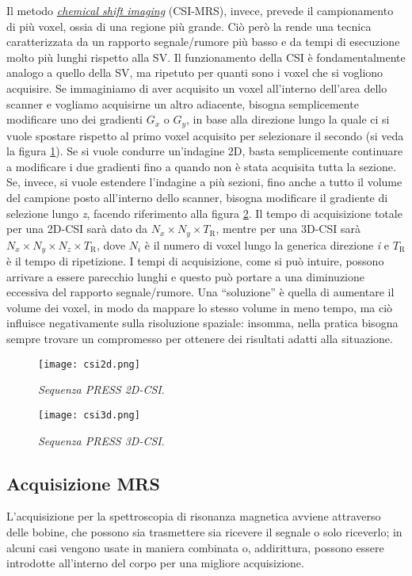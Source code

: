 \documentclass{report}
\newcommand{\virgolette}[1]{``#1''}
\newcommand{\figref}[1]{figura \ref{#1}}
\numberwithin{equation}{section}
\numberwithin{figure}{section}
\begin{document}
Il metodo \underline{\textit{chemical shift imaging}} (CSI-MRS), invece, prevede il campionamento di più voxel, ossia di una regione più grande. Ciò però la rende una tecnica caratterizzata da un rapporto segnale/rumore più basso e da tempi di esecuzione molto più lunghi rispetto alla SV. Il funzionamento della CSI è fondamentalmente analogo a quello della SV, ma ripetuto per quanti sono i voxel che si vogliono acquisire. Se immaginiamo di aver acquisito un voxel all'interno dell'area dello scanner e vogliamo acquisirne un altro adiacente, bisogna semplicemente modificare uno dei gradienti $G_x$ o $G_y$, in base alla direzione lungo la quale ci si vuole spostare rispetto al primo voxel acquisito per selezionare il secondo (si veda la \figref{fig:csi2d}). Se si vuole condurre un'indagine 2D, basta semplicemente continuare a modificare i due gradienti fino a quando non è stata acquisita tutta la sezione. Se, invece, si vuole estendere l'indagine a più sezioni, fino anche a tutto il volume del campione posto all'interno dello scanner, bisogna modificare il gradiente di selezione lungo \textit{z}, facendo riferimento alla \figref{fig:csi3d}. Il tempo di acquisizione totale per una 2D-CSI sarà dato da $N_x \times N_y \times T_\mathrm{R}$, mentre per una 3D-CSI sarà $N_x \times N_y \times N_z \times T_\mathrm{R}$, dove $N_i$ è il numero di voxel lungo la generica direzione \textit{i} e $T_\mathrm{R}$ è il tempo di ripetizione. I tempi di acquisizione, come si può intuire, possono arrivare a essere parecchio lunghi e questo può portare a una diminuzione eccessiva del rapporto segnale/rumore. Una \virgolette{soluzione} è quella di aumentare il volume dei voxel, in modo da mappare lo stesso volume in meno tempo, ma ciò influisce negativamente sulla risoluzione spaziale: insomma, nella pratica bisogna sempre trovare un compromesso per ottenere dei risultati adatti alla situazione.

\begin{figure}[htp]
\centering
\texttt{[image: csi2d.png]}
\caption{\label{fig:csi2d} \textit{Sequenza PRESS 2D-CSI}.}
\end{figure}

\begin{figure}[htp]
\centering
\texttt{[image: csi3d.png]}
\caption{\label{fig:csi3d} \textit{Sequenza PRESS 3D-CSI}.}
\end{figure}

\subsection{Acquisizione MRS}
L'acquisizione per la spettroscopia di risonanza magnetica avviene attraverso delle bobine, che possono sia trasmettere sia ricevere il segnale o solo riceverlo; in alcuni casi vengono usate in maniera combinata o, addirittura, possono essere introdotte all'interno del corpo per una migliore acquisizione.
\end{document}

